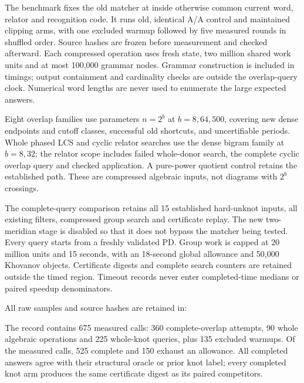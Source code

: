 The benchmark fixes the old matcher at  inside otherwise
common current word, relator and recognition code. It runs old, identical
A/A control and maintained clipping arms, with one excluded warmup followed
by five measured rounds in shuffled order. Source hashes are frozen before
measurement and checked afterward. Each compressed operation uses fresh
state, two million shared work units and at most 100,000 grammar nodes.
Grammar construction is included in timings; output containment and
cardinality checks are outside the overlap-query clock. Numerical word
lengths are never used to enumerate the large expected answers.

Eight overlap families use parameters $n=2^b$ at $b=8,64,500$, covering
new dense endpoints and cutoff classes, successful old shortcuts, and
uncertifiable periods. Whole phased LCS and cyclic relator searches use the
dense bigram family at $b=8,32$; the relator scope includes failed whole-donor
search, the complete cyclic overlap query and checked application. A pure-power
quotient control retains the established path. These are compressed algebraic
inputs, not diagrams with $2^b$ crossings.




The complete-query comparison retains all 15 established hard-unknot inputs,
all existing filters, compressed group search and certificate replay. The
new two-meridian stage is disabled so that it does not bypass the matcher
being tested. Every query starts from a freshly validated PD. Group work is
capped at 20 million units and 15 seconds, with an 18-second global allowance
and 50,000 Khovanov objects. Certificate digests and complete search counters
are retained outside the timed region. Timeout records never enter
completed-time medians or paired speedup denominators.



All raw samples and source hashes are retained in:
\begin{center}\small
{}
\end{center}
The record contains 675 measured calls: 360 complete-overlap attempts, 90
whole algebraic operations and 225 whole-knot queries, plus 135 excluded
warmups. Of the measured calls, 525 complete and 150 exhaust an allowance.
All completed answers agree with their structural oracle or prior knot
label; every completed knot arm produces the same certificate digest as its
paired competitors.

